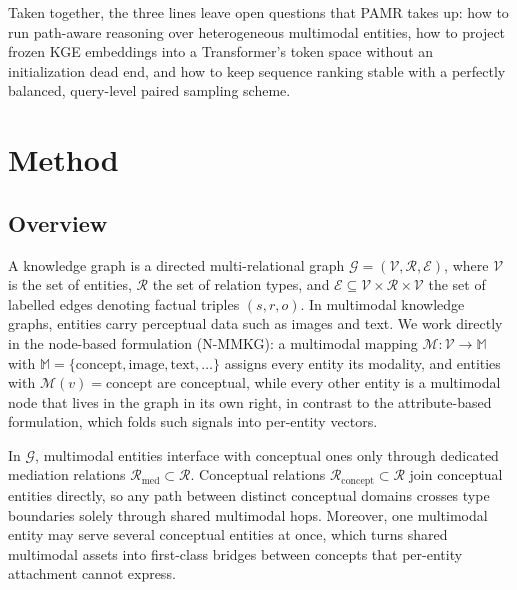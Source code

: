 \documentclass[runningheads]{llncs}
\begin{document}

Taken together, the three lines leave open questions that PAMR takes up: how to run path-aware reasoning over heterogeneous multimodal entities, how to project frozen KGE embeddings into a Transformer's token space without an initialization dead end, and how to keep sequence ranking stable with a perfectly balanced, query-level paired sampling scheme.

\section{Method}
\label{sec:method}
\subsection{Overview}
\label{sec:overview}

A knowledge graph is a directed multi-relational graph
$\mathcal{G} = (\mathcal{V}, \mathcal{R}, \mathcal{E})$, where $\mathcal{V}$
is the set of entities, $\mathcal{R}$ the set of relation types, and
$\mathcal{E} \subseteq \mathcal{V} \times \mathcal{R} \times \mathcal{V}$ the
set of labelled edges denoting factual triples $(s, r, o)$. In multimodal
knowledge graphs, entities carry perceptual data such as images and text.
We work directly in the node-based formulation (N-MMKG): a multimodal
mapping $\mathcal{M}: \mathcal{V} \rightarrow \mathbb{M}$ with
$\mathbb{M} = \{\text{concept}, \text{image}, \text{text}, \ldots\}$
assigns every entity its modality, and entities with
$\mathcal{M}(v) = \text{concept}$ are conceptual, while every other
entity is a multimodal node that lives in the graph in its own right,
in contrast to the attribute-based formulation, which folds such
signals into per-entity vectors.

In $\mathcal{G}$, multimodal entities interface with conceptual ones
only through dedicated mediation relations $\mathcal{R}_{\text{med}}
\subset \mathcal{R}$. Conceptual relations
$\mathcal{R}_{\text{concept}} \subset \mathcal{R}$ join conceptual
entities directly, so any path between distinct conceptual domains
crosses type boundaries solely through shared multimodal hops.
Moreover, one multimodal entity may serve several conceptual entities
at once, which turns shared multimodal assets into first-class bridges
between concepts that per-entity attachment cannot express.
\end{document}
